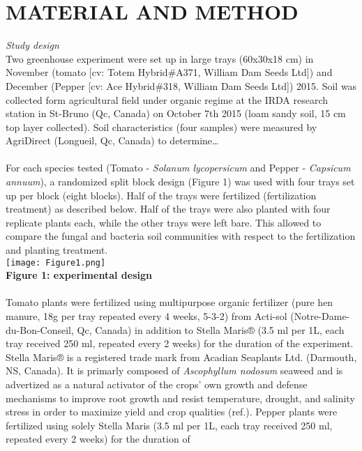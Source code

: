 \documentclass[11pt,]{article}
\begin{document}
\section{MATERIAL AND METHOD}\label{material-and-method}

\emph{Study design}\\
Two greenhouse experiment were set up in large trays (60x30x18 cm) in
November (tomato {[}cv: Totem Hybrid\#A371, William Dam Seeds Ltd{]})
and December (Pepper {[}cv: Ace Hybrid\#318, William Dam Seeds Ltd{]})
2015. Soil was collected form agricultural field under organic regime at
the IRDA research station in St-Bruno (Qc, Canada) on October 7th 2015
(loam sandy soil, 15 cm top layer collected). Soil characteristics (four
samples) were measured by AgriDirect (Longueil, Qc, Canada) to
determine\ldots{}\\
\hspace*{0.333em}\\
For each species tested (Tomato - \emph{Solanum lycopersicum} and Pepper
- \emph{Capsicum annuum}), a randomized split block design (Figure 1)
was used with four trays set up per block (eight blocks). Half of the
trays were fertilized (fertilization treatment) as described below. Half
of the trays were also planted with four replicate plants each, while
the other trays were left bare. This allowed to compare the fungal and
bacteria soil communities with respect to the fertilization and planting
treatment. ~\\
\texttt{[image: Figure1.png]}\\
\textbf{Figure 1: experimental design}\\
\hspace*{0.333em}\\
Tomato plants were fertilized using multipurpose organic fertilizer
(pure hen manure, 18g per tray repeated every 4 weeks, 5-3-2) from
Acti-sol (Notre-Dame-du-Bon-Conseil, Qc, Canada) in addition to Stella
Maris® (3.5 ml per 1L, each tray received 250 ml, repeated every 2
weeks) for the duration of the experiment. Stella Maris® is a registered
trade mark from Acadian Seaplants Ltd. (Darmouth, NS, Canada). It is
primarly composed of \emph{Ascophyllum nodosum} seaweed and is
advertized as a natural activator of the crops' own growth and defense
mechanisms to improve root growth and resist temperature, drought, and
salinity stress in order to maximize yield and crop qualities (ref.).
Pepper plants were fertilized using solely Stella Maris (3.5 ml per 1L,
each tray received 250 ml, repeated every 2 weeks) for the duration of
\end{document}
